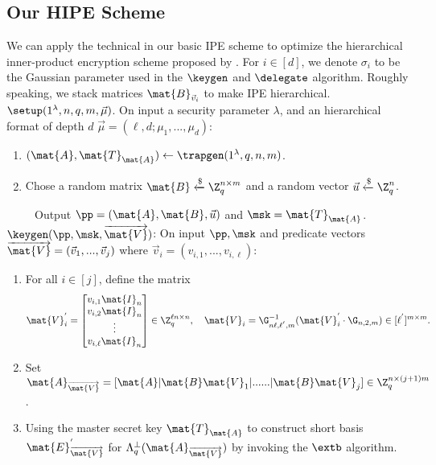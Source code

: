 \documentclass[11pt,hidelinks]{article}
\begin{document}
\begin{appendix}
\subsection{Our HIPE Scheme}
We can apply the technical in our basic IPE scheme to optimize the hierarchical inner-product encryption scheme proposed by \cite{PKC:Xagawa13}.  For $i \in [d]$, we denote $\sigma_{i}$ to be the Gaussian parameter used in the $\keygen$ and $\delegate$ algorithm. Roughly speaking, we stack matrices $\mat{B}_{\vec{v}_{i}}$ to make IPE hierarchical.\\[0.4cm]
$\setup(1^{\lambda}, n, q, m, \vec{\mu})$. On input a security parameter $\lambda$, and an hierarchical format of depth $d$ $\vec{\mu}=(\ell,d;\mu_{1},...,\mu_{d})$:
\begin{enumerate}
\item $(\mat{A}, \mat{T}_\mat{A})\leftarrow \trapgen(1^{\lambda}, q, n, m)$.
\item Chose a random matrix $\mat{B}\xleftarrow{\$} \Z^{n \times m}_{q}$ and a random vector $\vec{u}\xleftarrow{\$} \Z^{n}_{q}$.
\end{enumerate}
~~~~~Output $\pp=(\mat{A}, \mat{B}, \vec{u})$ and $\msk= \mat{T}_\mat{A}$.\\[0.4cm]
$\keygen(\pp, \msk, \overrightarrow{\mat{V}})$: On input $\pp, \msk$ and predicate vectors $\overrightarrow{\mat{V}}=(\vec{v}_{1},...,\vec{v}_{j})$ where $\vec{v}_{i}=(v_{i,1},...,v_{i,\ell})$:
\begin{enumerate}
\item For all $i \in [j]$, define the matrix
\begin{equation}
\mat{V}^{'}_{i}= \begin{bmatrix}
v_{i,1} \mat{I}_{n}\\
v_{i,2} \mat{I}_{n}\\
\vdots\\
v_{i,\ell} \mat{I}_{n}
\end{bmatrix} \in \Z^{\ell n \times n}_{q},~~~ \mat{V}_{i}=\G^{-1}_{n\ell,\ell^{'},m}(\mat{V}^{'}_{i}\cdot \G_{n,2,m}) \in [\ell^{'}]^{m \times m}.
\end{equation}
\item Set  $\mat{A}_{\overrightarrow{\mat{V}}}=[\mat{A} | \mat{B}\mat{V}_{1}| ...... | \mat{B}\mat{V}_{j}] \in \Z^{n \times (j+1)m}_{q}$.
\item Using the master secret key $\mat{T}_\mat{A}$ to construct short basis $\mat{E}^{'}_{\overrightarrow{\mat{V}}}$ for  $\Lambda^{\perp}_{q}(\mat{A}_{\overrightarrow{\mat{V}}})$  by  invoking the $\extb$ algorithm.

\end{enumerate}
\end{appendix}
\end{document}
